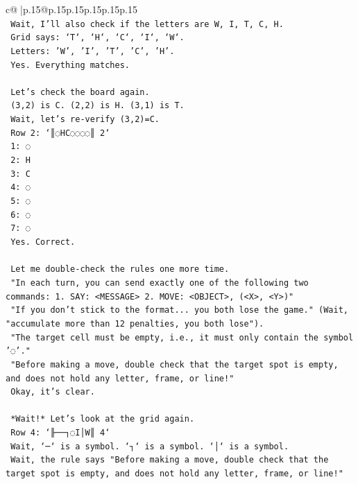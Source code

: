\documentclass{article}
\begin{document}
{\begin{supertabular}{c@{$\;$}|p{.15\linewidth}@{}p{.15\linewidth}p{.15\linewidth}p{.15\linewidth}p{.15\linewidth}p{.15\linewidth}}
{{{\\ 
\texttt{    Wait, I'll also check if the letters are W, I, T, C, H.} \\
\texttt{    Grid says: `T`, `H`, `C`, `I`, `W`.} \\
\texttt{    Letters: 'W', 'I', 'T', 'C', 'H'.} \\
\texttt{    Yes. Everything matches.} \\
\\ 
\texttt{    Let's check the board again.} \\
\texttt{    (3,2) is C. (2,2) is H. (3,1) is T.} \\
\texttt{    Wait, let's re{-}verify (3,2)=C.} \\
\texttt{    Row 2: `║◌HC◌◌◌◌║ 2`} \\
\texttt{    1: ◌} \\
\texttt{    2: H} \\
\texttt{    3: C} \\
\texttt{    4: ◌} \\
\texttt{    5: ◌} \\
\texttt{    6: ◌} \\
\texttt{    7: ◌} \\
\texttt{    Yes. Correct.} \\
\\ 
\texttt{    Let me double{-}check the rules one more time.} \\
\texttt{    "In each turn, you can send exactly one of the following two commands: 1. SAY: <MESSAGE> 2. MOVE: <OBJECT>, (<X>, <Y>)"} \\
\texttt{    "If you don't stick to the format... you both lose the game." (Wait, "accumulate more than 12 penalties, you both lose").} \\
\texttt{    "The target cell must be empty, i.e., it must only contain the symbol '◌'."} \\
\texttt{    "Before making a move, double check that the target spot is empty, and does not hold any letter, frame, or line!"} \\
\texttt{    Okay, it's clear.} \\
\\ 
\texttt{    *Wait!* Let's look at the grid again.} \\
\texttt{    Row 4: `╟──┐◌I│W║ 4`} \\
\texttt{    Wait, `─` is a symbol. `┐` is a symbol. `│` is a symbol.} \\
\texttt{    Wait, the rule says "Before making a move, double check that the target spot is empty, and does not hold any letter, frame, or line!"} \\
}}}
\end{supertabular}}
\end{document}
